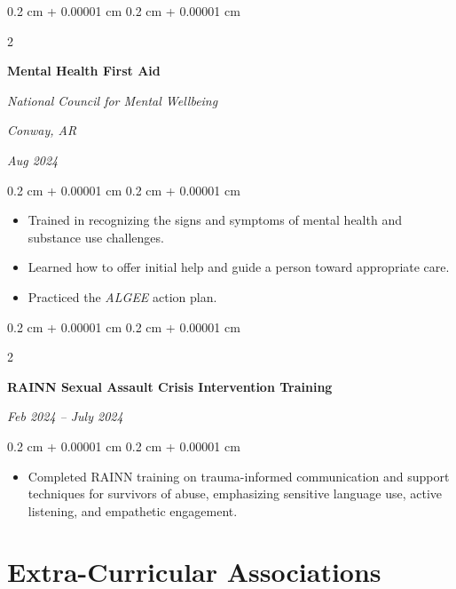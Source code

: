 \documentclass[10pt, letterpaper]{article}
\newenvironment{highlights}{
    \begin{itemize}[
        topsep=0.10 cm,
        parsep=0.10 cm,
        partopsep=0pt,
        itemsep=0pt,
        leftmargin=0.4 cm + 10pt
    ]
}{
    \end{itemize}
} %
\newenvironment{onecolentry}{
    \begin{adjustwidth}{
        0.2 cm + 0.00001 cm
    }{
        0.2 cm + 0.00001 cm
    }
}{
    \end{adjustwidth}
} %
\newenvironment{twocolentry}[2][]{
    \onecolentry
    \def\secondColumn{#2}
    \setcolumnwidth{\fill, 4.5 cm}
    \begin{paracol}{2}
}{
    \switchcolumn \raggedleft \secondColumn
    \end{paracol}
    \endonecolentry
} %
\begin{document}
        \vspace{0.2cm}

            
        \begin{twocolentry}{
            \textit{Conway, AR}

            \textit{Aug 2024}}
                \textbf{Mental Health First Aid}

                \textit{National Council for Mental Wellbeing}
            \end{twocolentry}

        \vspace{0.10cm}
        \begin{onecolentry}
            \begin{highlights}
                \item Trained in recognizing the signs and symptoms of mental health and substance use challenges.
                \item Learned how to offer initial help and guide a person toward appropriate care.
                \item Practiced the \textit{ALGEE} action plan.
            \end{highlights}
        \end{onecolentry}

        \vspace{0.2 cm}

        \begin{twocolentry}{
            \textit{Feb 2024 – July 2024}
        }
            \textbf{RAINN Sexual Assault Crisis Intervention Training}

            \vspace{0.10 cm}

        \end{twocolentry}

        \begin{onecolentry}
            \begin{highlights}
                \item  Completed RAINN training on trauma-informed communication and support techniques for survivors of abuse, emphasizing sensitive language use, active listening, and empathetic engagement.
            \end{highlights}
        \end{onecolentry}


    
    \section{Extra-Curricular Associations}
\end{document}

